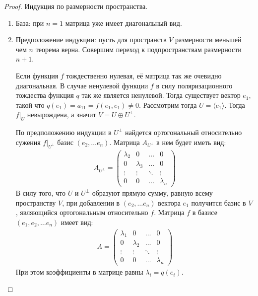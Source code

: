 \begin{proof}
    Индукция по размерности пространства.
    \begin{enumerate}
        \item База: при $n=1$ матрица уже имеет диагональный вид.
        \item Предположение индукции: пусть для пространств $V$ размерности меньшей чем $n$ 
        теорема верна. Совершим переход к подпространствам размерности $n+1$.

        Если функция $f$ тождественно нулевая, её матрица так же очевидно диагональная. В случае ненулевой функции $f$ в силу поляризационного тождества функция $q$ так же является ненулевой. Тогда существует вектор $e_1$, такой что $q(e_1) = a_{11} = f(e_1, e_1) \neq 0$. Рассмотрим тогда $U = \langle e_1 \rangle$. Тогда $f \vert_{U}$ невырождена, а значит $V = U \oplus U^{\perp}$. 

        По предположению индукции в $U^{\perp}$ найдется ортогональный относительно сужения 
        $f \vert_{U^{\perp}}$ базис $(e_2, \dots e_n)$. Матрица $A_{U^{\perp}}$ в нем будет иметь вид:
        \begin{gather*}
            A_{U^{\perp}} = \begin{pmatrix}
                \lambda_2  & 0         & \dots  & 0         \\
                0          & \lambda_3 & \dots  & 0         \\
                \vdots     & \vdots    & \ddots & \vdots    \\
                0          & 0         & \dots  & \lambda_n
            \end{pmatrix}
        \end{gather*}
        В силу того, что $U$ и $U^{\perp}$ образуют прямую сумму, равную всему пространству $V$,
        при добавлении в $(e_2, \dots e_n)$ вектора $e_1$ получится базис в $V$, 
        являющийся ортогональным относительно $f$. Матрица $f$ в базисе $(e_1, e_2, \dots e_n)$ имеет 
        вид:
        \begin{gather*}
            A = \begin{pmatrix}
                \lambda_1  & 0         & \dots  & 0         \\
                0          & \lambda_2 & \dots  & 0         \\
                \vdots     & \vdots    & \ddots & \vdots    \\
                0          & 0         & \dots  & \lambda_n
            \end{pmatrix}
        \end{gather*}
        При этом коэффициенты в матрице равны $\lambda_i = q(e_i)$.
    \end{enumerate}
\end{proof}

